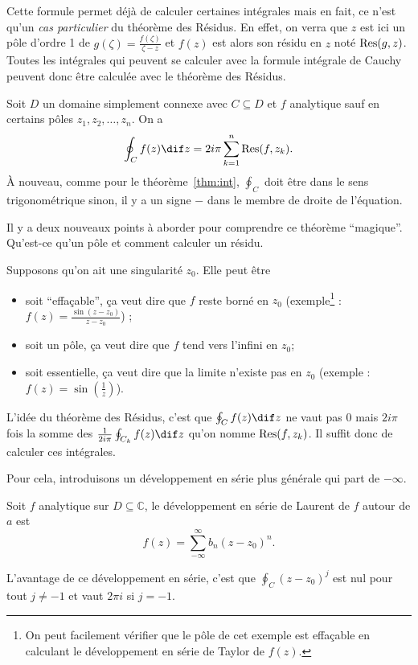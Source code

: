Cette formule permet déjà de calculer certaines intégrales mais
en fait, ce n'est qu'un \emph{cas particulier} du théorème des Résidus.
En effet, on verra que $z$ est ici un pôle d'ordre 1 de
$g(\zeta)=\frac{f(\zeta)}{\zeta-z}$
et $f(z)$ est alors son résidu en $z$ noté
$\operatorname{Res}(g,z)$.
Toutes les intégrales qui peuvent se calculer avec la formule
intégrale de Cauchy peuvent donc être calculée avec le théorème
des Résidus.

\begin{mytheo}
  Soit $D$ un domaine simplement connexe avec
  $C \subseteq D$ et $f$ analytique
  sauf en certains pôles $z_1, z_2, \ldots, z_n$.
  On a
  \[ \oint_C f(z) \dif z = 2i\pi\sum_{k=1}^n \res(f, z_k). \]
  À nouveau,
  comme pour le théorème~\ref{thm:int},
  $\oint_C$ doit être dans le sens trigonométrique sinon,
  il y a un signe $-$ dans le membre de droite de l'équation.
\end{mytheo}

Il y a deux nouveaux points à aborder pour comprendre ce théorème
``magique''.
Qu'est-ce qu'un pôle et comment calculer un résidu.

Supposons qu'on ait une singularité $z_0$.
Elle peut être
\begin{itemize}
  \item soit ``effaçable'', ça veut dire que $f$ reste borné en $z_0$
	(exemple\footnote{On peut facilement vérifier que le pôle
	de cet exemple est effaçable en calculant le développement
	en série de Taylor de $f(z)$.} : $f(z) = \frac{\sin(z-z_0)}{z-z_0}$) ;
  \item soit un pôle, ça veut dire que $f$ tend vers l'infini en $z_0$;
  \item soit essentielle, ça veut dire que la limite n'existe pas en $z_0$
	(exemple : $f(z) = \sin(\frac{1}{z})$).
\end{itemize}

L'idée du théorème des Résidus, c'est que $\oint_C f(z) \dif z$ ne vaut
pas 0 mais $2i\pi$ fois la somme des
$\frac{1}{2i\pi} \oint_{C_k} f(z) \dif z$ qu'on
nomme $\operatorname{Res}(f, z_k)$.
Il suffit donc de calculer ces intégrales.

Pour cela, introduisons un développement en série plus générale qui
part de $-\infty$.
\begin{mydef}
  Soit $f$ analytique sur $D \subseteq \mathbb{C}$,
  le développement en série de Laurent de $f$ autour de $a$ est
  \[ f(z) = \sum_{-\infty}^{\infty}b_n(z-z_0)^n. \]
\end{mydef}
L'avantage de ce développement en série, c'est que
$\oint_C (z-z_0)^j$ est nul pour tout $j \neq -1$ et vaut $2\pi i$ si
$j = -1$.

